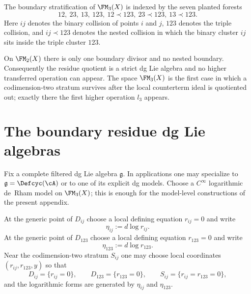 \begin{definition}
\label{def:fm3-planted-forests}
The boundary stratification of $\FM_3(X)$ is indexed by the seven planted forests
\[
12,\ 23,\ 13,\ 123,\ 12\prec 123,\ 23\prec 123,\ 13\prec 123.
\]
Here $ij$ denotes the binary collision of points $i$ and $j$, $123$ denotes the
triple collision, and $ij\prec 123$ denotes the nested collision in which the
binary cluster $ij$ sits inside the triple cluster $123$.
\end{definition}

\begin{remark}
On $\FM_2(X)$ there is only one boundary divisor and no nested boundary.
Consequently the residue quotient is a strict dg Lie algebra and no higher
transferred operation can appear.  The space $\FM_3(X)$ is the first case in
which a codimension-two stratum survives after the local counterterm ideal is
quotiented out; exactly there the first higher operation $l_3$ appears.
\end{remark}

\section{The boundary residue dg Lie algebras}
\label{sec:fm3-residue-dglas}

Fix a complete filtered dg Lie algebra $\mathfrak{g}$.  In applications one may
specialize to $\mathfrak{g}=\Defcyc(\cA)$ or to one of its explicit dg models.
Choose a $C^\infty$ logarithmic de~Rham model on $\FM_3(X)$; this is enough for
the model-level constructions of the present appendix.

At the generic point of $D_{ij}$ choose a local defining equation $r_{ij}=0$ and
write
\[
\eta_{ij} := d\log r_{ij}.
\]
At the generic point of $D_{123}$ choose a local defining equation
$r_{123}=0$ and write
\[
\eta_{123} := d\log r_{123}.
\]
Near the codimension-two stratum $S_{ij}$ one may choose local coordinates
$(r_{ij},r_{123},y)$ so that
\[
D_{ij} = \{r_{ij}=0\},
\qquad
D_{123} = \{r_{123}=0\},
\qquad
S_{ij} = \{r_{ij}=r_{123}=0\},
\]
and the logarithmic forms are generated by $\eta_{ij}$ and $\eta_{123}$.

